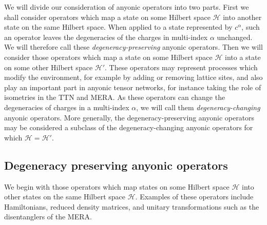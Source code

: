 \documentclass[aps,prb,reprint,superscriptaddress,amsfonts,amsmath,amssymb,showpacs,floatfix]{revtex4-1}
\newcommand{\mc}[1]{\mathcal{#1}}
\newcommand{\fref}[1]{Fig.~\ref{#1}}
\newcommand{\sref}[1]{Sec.~\ref{#1}}
\newcommand{\p}[1]{\phantom{#1}}
\newcommand{\Mop}{M_\alpha^{\p{\alpha}\beta}}
\begin{document}
We will divide our consideration of anyonic operators into two parts. First we shall consider operators which map a state on some Hilbert space $\mc{H}$ into another state on the same Hilbert space. When applied to a state represented by $c^\alpha$, such an operator leaves the degeneracies of the charges in multi-index $\alpha$ unchanged. We will therefore call these
\emph{degeneracy-preserving} anyonic operators.
Then we will consider those operators which map a state on some Hilbert space $\mc{H}$ into a state on some other Hilbert space $\mc{H}'$. These operators may represent processes which modify the environment, for example by adding or removing lattice sites, and also play an important part in anyonic tensor networks, for instance taking the role of isometries in the TTN and MERA. 
As these operators can change the degeneracies of charges in a multi-index $\alpha$, we will call them \emph{degeneracy-changing} anyonic operators.
More generally, the degeneracy-preserving anyonic operators may be considered a subclass of the degeneracy-changing anyonic operators for which $\mc{H}=\mc{H}'$.

\subsection{Degeneracy preserving anyonic operators\label{sec:anyonops}}

We begin with those operators which map
states on some Hilbert space $\mc{H}$ into other states on the same Hilbert space $\mc{H}$. 
Examples of these operators include Hamiltonians, reduced density matrices, and unitary transformations such as the disentanglers of the MERA.
\end{document}
